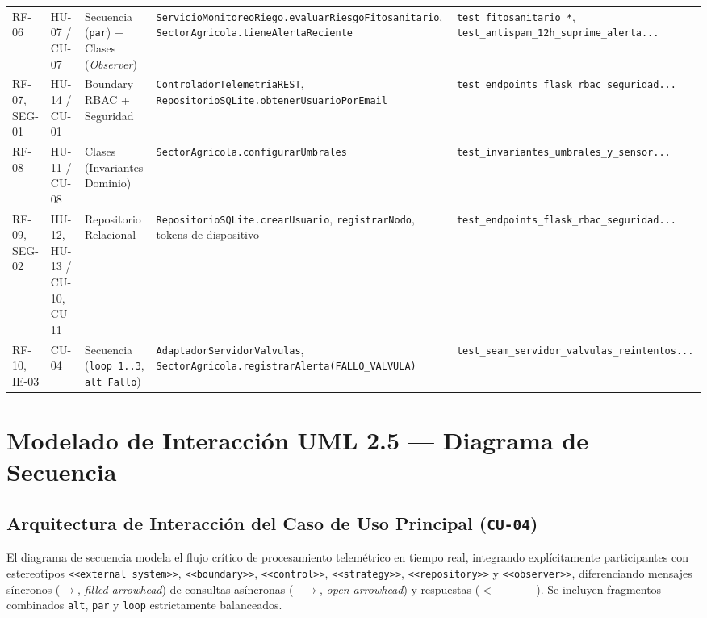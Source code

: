 \documentclass[11pt,letterpaper]{report}
\begin{document}
\begin{table}[H]
\begin{tabularx}{\textwidth}{L{1.5cm} L{2.1cm} L{2.7cm} L{4.7cm} Y}
RF-06 & HU-07 / CU-07 & Secuencia (\texttt{par}) + Clases (\textit{Observer}) & \texttt{ServicioMonitoreoRiego.\allowbreak evaluarRiesgoFitosanitario}, \texttt{SectorAgricola.\allowbreak tieneAlertaReciente} & \texttt{test\_\allowbreak fitosanitario\_*}, \texttt{test\_\allowbreak antispam\_\allowbreak 12h\_\allowbreak suprime\_\allowbreak alerta...} \\
RF-07, SEG-01 & HU-14 / CU-01 & Boundary RBAC + Seguridad & \texttt{ControladorTelemetriaREST}, \texttt{RepositorioSQLite.\allowbreak obtenerUsuarioPorEmail} & \texttt{test\_\allowbreak endpoints\_\allowbreak flask\_\allowbreak rbac\_\allowbreak seguridad...} \\
RF-08 & HU-11 / CU-08 & Clases (Invariantes Dominio) & \texttt{SectorAgricola.\allowbreak configurarUmbrales} & \texttt{test\_\allowbreak invariantes\_\allowbreak umbrales\_\allowbreak y\_\allowbreak sensor...} \\
RF-09, SEG-02 & HU-12, HU-13 / CU-10, CU-11 & Repositorio Relacional & \texttt{RepositorioSQLite.\allowbreak crearUsuario}, \texttt{registrarNodo}, tokens de dispositivo & \texttt{test\_\allowbreak endpoints\_\allowbreak flask\_\allowbreak rbac\_\allowbreak seguridad...} \\
RF-10, IE-03 & CU-04 & Secuencia (\texttt{loop 1..3}, \texttt{alt Fallo}) & \texttt{AdaptadorServidorValvulas}, \texttt{SectorAgricola.\allowbreak registrarAlerta(\allowbreak FALLO\_\allowbreak VALVULA)} & \texttt{test\_\allowbreak seam\_\allowbreak servidor\_\allowbreak valvulas\_\allowbreak reintentos...} \\
\bottomrule
\end{tabularx}
\end{table}

\chapter{Modelado de Interacción UML 2.5 --- Diagrama de Secuencia}

\section{Arquitectura de Interacción del Caso de Uso Principal (\texttt{CU-04})}
El diagrama de secuencia modela el flujo crítico de procesamiento telemétrico en tiempo real, integrando explícitamente participantes con estereotipos \texttt{<<external system>>}, \texttt{<<boundary>>}, \texttt{<<control>>}, \texttt{<<strategy>>}, \texttt{<<repository>>} y \texttt{<<observer>>}, diferenciando mensajes síncronos ($\longrightarrow$, \textit{filled arrowhead}) de consultas asíncronas ($-\!\!\!\rightarrow$, \textit{open arrowhead}) y respuestas ($<\!\!\!-\!-\!-$). Se incluyen fragmentos combinados \texttt{alt}, \texttt{par} y \texttt{loop} estrictamente balanceados.
\end{document}
